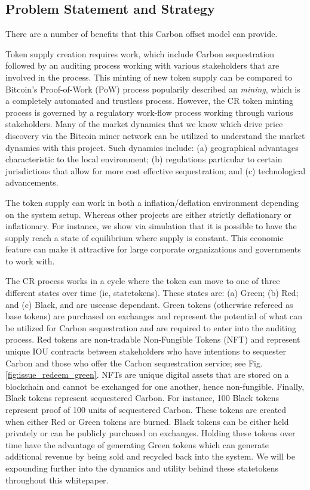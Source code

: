\documentclass{article}
\begin{document}
\subsection{Problem Statement and Strategy}

There are a number of benefits that this Carbon offset model can provide. 

Token supply creation requires work, which include Carbon sequestration followed by an auditing process working with various stakeholders that are involved in the process. This minting of new token supply can be compared to Bitcoin's Proof-of-Work (PoW) process popularily described an \emph{mining}, which is a completely automated and trustless process. However, the CR token minting process is governed by a regulatory work-flow process working through various stakeholders. Many of the market dynamics that we know which drive price discovery via the Bitcoin miner network can be utilized to understand the market dynamics with this project. Such dynamics include: (a) geographical advantages characteristic to the local environment; (b) regulations particular to certain jurisdictions that allow for more cost effective sequestration; and (c) technological advancements.

The token supply can work in both a inflation/deflation environment depending on the system setup. Whereas other projects are either strictly deflationary or inflationary. For instance, we show via simulation that it is possible to have the supply reach a state of equilibrium where supply is constant.  This economic feature can make it attractive for large corporate organizations and governments to work with.

The CR process works in a cycle where the token can move to one of three different states over time (ie, statetokens). These states are: (a) Green; (b) Red; and (c) Black, and are usecase dependant. Green tokens (otherwise refereed as base tokens) are purchased on exchanges and represent the potential of what can be utilized for Carbon sequestration and are required to enter into the auditing process. Red tokens are non-tradable Non-Fungible Tokens (NFT) and represent unique IOU contracts between stakeholders who have intentions to sequester Carbon and those who offer the Carbon sequestration service; see Fig. \ref{fig:issue_redeem_green}. NFTs are unique digital assets that are stored on a blockchain and cannot be exchanged for one another, hence non-fungible. Finally, Black tokens represent sequestered Carbon. For instance, 100 Black tokens represent proof of 100 units of sequestered Carbon. These tokens are created when either Red or Green tokens are burned. Black tokens can be either held privately or can be publicly purchased on exchanges. Holding these tokens over time have the advantage of generating Green tokens which can generate additional revenue by being sold and recycled back into the system. We will be expounding further into the dynamics and utility behind these statetokens throughout this whitepaper.
 
\end{document}
